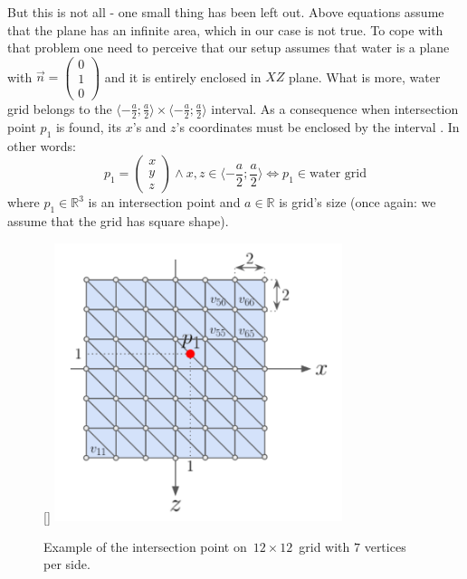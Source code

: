 \documentclass{report}
\begin{document}
But this is not all - one small thing has been left out. Above equations assume that the plane has an infinite area, which in our case is not true. To cope with that problem one need to perceive that our setup assumes that water is a plane with $ \vec{n} = \left(\begin{smallmatrix}0 \\ 1 \\0 \end{smallmatrix}\right)$ and it is entirely enclosed in $XZ$ plane. What is more, water grid belongs to the $\langle -\frac{a}{2} ; \frac{a}{2}  \rangle \times \langle -\frac{a}{2} ; \frac{a}{2}  \rangle$ interval. As a consequence when intersection point $p_1$ is found, its $x$'s and $z$'s coordinates must be enclosed by the interval . In other words:
\begin{equation}
p_1= \left(\begin{smallmatrix} x \\ y \\ z \end{smallmatrix}\right) \wedge x, z \in \langle -\frac{a}{2} ; \frac{a}{2}  \rangle  \Leftrightarrow  p_1 \in \text{water grid}
\end{equation}
where $p_1 \in \mathbb{R}^{3}$ is an intersection point and $a \in \mathbb{R}$ is grid's size (once again: we assume that the grid has square shape). 

\begin{figure}
  \raisebox{0pt}[\dimexpr{}\baselineskip\relax]
  {
    \includegraphics[width=0.75\textwidth]{images/example_quad.pdf}
  }
  \caption{Example of the intersection point on~$12 \times 12$~grid with $7$ vertices per side.}
  \label{fig:example_quad}
\end{figure}
\end{document}
